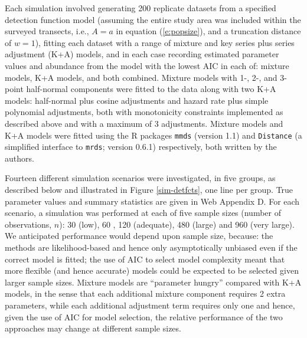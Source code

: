 \documentclass[authoryear,preprint,review,12pt]{elsarticle}
\begin{document}
Each simulation involved generating 200 replicate datasets from a specified detection function model (assuming the entire study area was included within the surveyed transects, i.e., $A=a$ in equation (\ref{e:popsize}), and a truncation distance of $w=1$), fitting each dataset with a range of mixture and key series plus series adjustment (K+A) models, and in each case recording estimated parameter values and abundance from the model with the lowest AIC in each of: mixture models, K+A models, and both combined.  Mixture models with 1-, 2-, and 3-point half-normal components were fitted to the data along with two K+A models: half-normal plus cosine adjustments and hazard rate plus simple polynomial adjustments, both with monotonicity constraints implemented as described above and with a maximum of 3 adjustments. Mixture models and K+A models were fitted using the R packages \texttt{mmds} (version 1.1) and \texttt{Distance} (a simplified interface to \texttt{mrds}; version 0.6.1) respectively, both written by the authors.

Fourteen different simulation scenarios were investigated, in five groups, as described below and illustrated in Figure \ref{sim-detfcts}, one line per group. True parameter values and summary statistics are given in Web Appendix D.  For each scenario, a simulation was performed at each of five sample sizes (number of observations, $n$): 30 (low), 60 \citep[recommended minimum for line transects;][]{Buckland:2001vm}, 120 (adequate), 480 (large) and 960 (very large).  We anticipated performance would depend upon sample size, because: the methods are likelihood-based and hence only asymptotically unbiased even if the correct model is fitted; the use of AIC to select model complexity meant that more flexible (and hence accurate) models could be expected to be selected given larger sample sizes. Mixture models are ``parameter hungry'' compared with K+A models, in the sense that each additional mixture component requires 2 extra parameters, while each additional adjustment term requires only one and hence, given the use of AIC for model selection, the relative performance of the two approaches may change at different sample sizes. 
\end{document}
